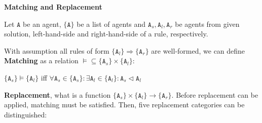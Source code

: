 \documentclass[12pt]{article}
\newcommand{\mysection}[1]{{\newpage\centering\Large\textbf{#1}\\}\normalsize\vspace{0.5cm}}
\begin{document}
\mysection{Matching and Replacement}

Let $\mathtt{A}$ be an agent, $\{\mathtt{A}\}$ be a list of agents and $\mathtt{A}_s, \mathtt{A}_l, \mathtt{A}_r$ be agents from given solution, left-hand-side and right-hand-side of a rule, respectively.

With assumption all rules of form $\{\mathtt{A}_l\} \Rightarrow \{\mathtt{A}_r\}$ are well-formed, we can define \textbf{Matching} as a relation $\models \subseteq \{\mathtt{A}_s\} \times \{\mathtt{A}_l\} $:

\begin{center}
$\{\mathtt{A}_s\} \models \{\mathtt{A}_l\}$ iff $\forall \mathtt{A}_s \in \{\mathtt{A}_s\}: \exists \mathtt{A}_l \in \{\mathtt{A}_l\}: \mathtt{A}_s \lhd \mathtt{A}_l$
\end{center}

\textbf{Replacement}, what is a function $\{\mathtt{A}_s\} \times \{\mathtt{A}_l\} \rightarrow \{\mathtt{A}_r\}$. Before replacement can be applied, matching must be satisfied. Then, five replacement categories can be distinguished:
\end{document}
